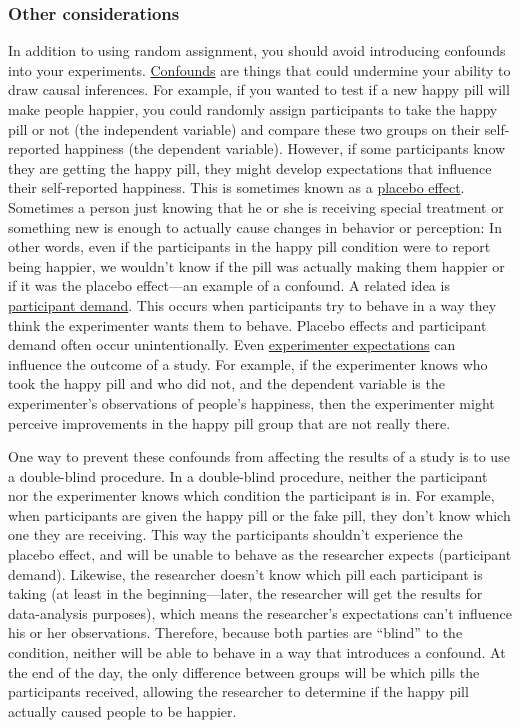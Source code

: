 \documentclass[
]{krantz}
\begin{document}
\subsubsection*{Other considerations}\label{other-considerations}


In addition to using random assignment, you should avoid introducing confounds into your experiments. \hyperref[confounds]{Confounds} are things that could undermine your ability to draw causal inferences. For example, if you wanted to test if a new happy pill will make people happier, you could randomly assign participants to take the happy pill or not (the independent variable) and compare these two groups on their self-reported happiness (the dependent variable). However, if some participants know they are getting the happy pill, they might develop expectations that influence their self-reported happiness. This is sometimes known as a \hyperref[placebo-effect]{placebo effect}. Sometimes a person just knowing that he or she is receiving special treatment or something new is enough to actually cause changes in behavior or perception: In other words, even if the participants in the happy pill condition were to report being happier, we wouldn't know if the pill was actually making them happier or if it was the placebo effect---an example of a confound. A related idea is \hyperref[participant-demand]{participant demand}. This occurs when participants try to behave in a way they think the experimenter wants them to behave. Placebo effects and participant demand often occur unintentionally. Even \hyperref[experimenter-expectations]{experimenter expectations} can influence the outcome of a study. For example, if the experimenter knows who took the happy pill and who did not, and the dependent variable is the experimenter's observations of people's happiness, then the experimenter might perceive improvements in the happy pill group that are not really there.

One way to prevent these confounds from affecting the results of a study is to use a double-blind procedure. In a double-blind procedure, neither the participant nor the experimenter knows which condition the participant is in. For example, when participants are given the happy pill or the fake pill, they don't know which one they are receiving. This way the participants shouldn't experience the placebo effect, and will be unable to behave as the researcher expects (participant demand). Likewise, the researcher doesn't know which pill each participant is taking (at least in the beginning---later, the researcher will get the results for data-analysis purposes), which means the researcher's expectations can't influence his or her observations. Therefore, because both parties are ``blind'' to the condition, neither will be able to behave in a way that introduces a confound. At the end of the day, the only difference between groups will be which pills the participants received, allowing the researcher to determine if the happy pill actually caused people to be happier.
\end{document}
